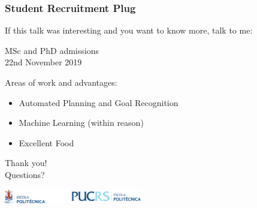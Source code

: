 \documentclass[usenames,dvipsnames]{beamer}
\begin{document}

\begin{frame}[c]\frametitle{Student Recruitment Plug}
	If this talk was interesting and you want to know more, talk to me:\\[2em]
	\begin{center}
		{\Large
		MSc and PhD admissions \\[2em] 22nd November 2019
		}
	\end{center}
	Areas of work and advantages:
	\begin{itemize}
		\item Automated Planning and Goal Recognition
		\item Machine Learning (within reason)
		\item Excellent Food
	\end{itemize}
\end{frame}



	{
    \begin{frame}[c]{}
    		\centering
    		Thank you!
			\\
			Questions?
			\begin{center}
				\includegraphics[width=6cm]{politecnica.pdf}
			\end{center}
    \end{frame}
    }

\end{document}
